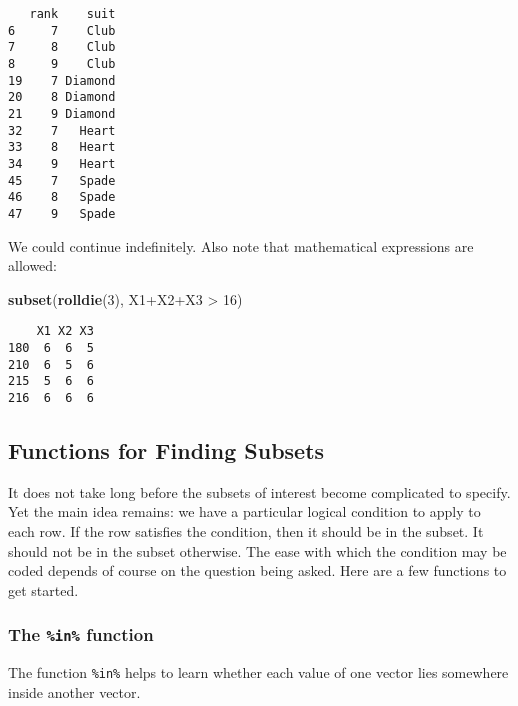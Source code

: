 \documentclass[]{book}
\newenvironment{Shaded}{\begin{snugshade}}{\end{snugshade}}
\newcommand{\KeywordTok}[1]{\textcolor[rgb]{0.13,0.29,0.53}{\textbf{{#1}}}}
\newcommand{\DecValTok}[1]{\textcolor[rgb]{0.00,0.00,0.81}{{#1}}}
\newcommand{\StringTok}[1]{\textcolor[rgb]{0.31,0.60,0.02}{{#1}}}
\newcommand{\NormalTok}[1]{{#1}}
\numberwithin{equation}{chapter}
\numberwithin{figure}{chapter}
\theoremstyle{plain}
\theoremstyle{definition}
\theoremstyle{remark}
\theoremstyle{definition}
\theoremstyle{definition}
\theoremstyle{remark}
\begin{document}
\begin{Shaded}
\end{Shaded}

\begin{verbatim}
   rank    suit
6     7    Club
7     8    Club
8     9    Club
19    7 Diamond
20    8 Diamond
21    9 Diamond
32    7   Heart
33    8   Heart
34    9   Heart
45    7   Spade
46    8   Spade
47    9   Spade
\end{verbatim}

We could continue indefinitely. Also note that mathematical expressions
are allowed:

\begin{Shaded}
\begin{Highlighting}[]
\KeywordTok{subset}\NormalTok{(}\KeywordTok{rolldie}\NormalTok{(}\DecValTok{3}\NormalTok{), X1+X2+X3 >}\StringTok{ }\DecValTok{16}\NormalTok{) }
\end{Highlighting}
\end{Shaded}

\begin{verbatim}
    X1 X2 X3
180  6  6  5
210  6  5  6
215  5  6  6
216  6  6  6
\end{verbatim}

\subsection{Functions for Finding
Subsets}\label{functions-for-finding-subsets}

It does not take long before the subsets of interest become complicated
to specify. Yet the main idea remains: we have a particular logical
condition to apply to each row. If the row satisfies the condition, then
it should be in the subset. It should not be in the subset otherwise.
The ease with which the condition may be coded depends of course on the
question being asked. Here are a few functions to get started.

\subsubsection{\texorpdfstring{The \texttt{\%in\%}
function}{The \%in\% function}}\label{the-in-function}

The function \texttt{\%in\%} helps to learn whether each value of one
vector lies somewhere inside another vector.
\end{document}
